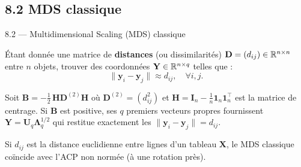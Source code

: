 \subsection{8.2 MDS classique}
\begin{frame}{8.2 — Multidimensional Scaling (MDS) classique}
\begin{definition}
Étant donnée une matrice de \textbf{distances} (ou dissimilarités)
$\mathbf{D} = (d_{ij}) \in \mathbb{R}^{n \times n}$ entre $n$ objets, trouver
des coordonnées $\mathbf{Y} \in \mathbb{R}^{n \times q}$ telles que :
\[
\|\mathbf{y}_i - \mathbf{y}_j\| \approx d_{ij}, \quad \forall i, j.
\]
\end{definition}

\begin{theorem}
Soit $\mathbf{B} = -\frac{1}{2}\,\mathbf{H}\mathbf{D}^{(2)}\mathbf{H}$ où
$\mathbf{D}^{(2)} = (d_{ij}^2)$ et $\mathbf{H} = \mathbf{I}_n - \frac{1}{n}\mathbf{1}_n \mathbf{1}_n^\top$
est la matrice de centrage. Si $\mathbf{B}$ est positive, ses $q$ premiers
vecteurs propres fournissent $\mathbf{Y} = \mathbf{U}_q \mathbf{\Lambda}_q^{1/2}$ qui
restitue exactement les $\|\mathbf{y}_i - \mathbf{y}_j\| = d_{ij}$.
\end{theorem}

\begin{rema}
\small Si $d_{ij}$ est la distance euclidienne entre lignes d'un tableau $\mathbf{X}$,
le MDS classique \alert{coïncide} avec l'ACP non normée (à une rotation près).
\end{rema}
\end{frame}

